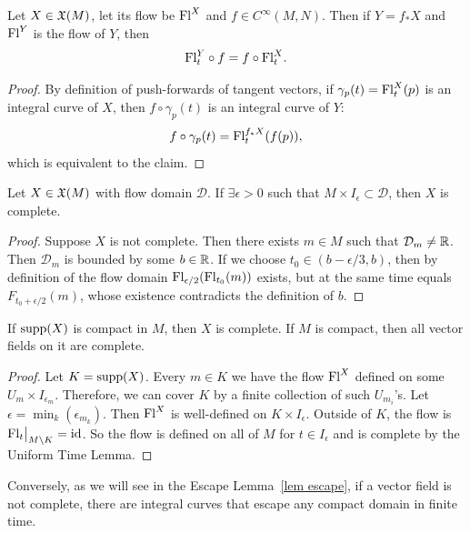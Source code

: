 \begin{cor}\label{cor naturality of flows}
    Let $X\in\mathfrak{X}(M)$, let its flow be $\mathrm{Fl}^X$ and $f\in C^\infty(M,N)$. Then if $Y=f_\ast X$ and $\mathrm{Fl}^Y$ is the flow of $Y$, then 
    \[\mathrm{Fl}^Y_t\circ f=f\circ \mathrm{Fl}^X_t.\]
\end{cor}
\begin{proof}
    By definition of push-forwards of tangent vectors, if $\gamma_p(t)=\mathrm{Fl}_t^X(p)$ is an integral curve of $X$, then $f\circ \gamma_p(t)$ is an integral curve of $Y$:
    \[f\circ \gamma_p(t)=\mathrm{Fl}^{f_\ast X}_t(f(p)),\]
    which is equivalent to the claim.
\end{proof}

\begin{thm}\label{lem uniform time}
    Let $X\in\mathfrak{X}(M)$ with flow domain $\mathcal{D}$. If $\exists\epsilon>0$ such that $M\times I_\epsilon\subset\mathcal{D}$, then $X$ is complete.
\end{thm}
\begin{proof}
    Suppose $X$ is not complete. Then there exists $m\in M$ such that $\mathcal{D}_m\neq \mathbb{R} $. Then $\mathcal{D}_m$ is bounded by some $b\in\mathbb{R} $. If we choose $t_0\in(b-\epsilon/3,b)$, then by definition of the flow domain $\mathrm{Fl}_{\epsilon/2}(\mathrm{Fl}_{t_0}(m))$ exists, but at the same time equals $F_{t_0+\epsilon/2}(m)$, whose existence contradicts the definition of $b$.
\end{proof}
\begin{cor}
    If $\operatorname{supp} (X)$ is compact in $M$, then $X$ is complete. If $M$ is compact, then all vector fields on it are complete.
\end{cor}
\begin{proof}
    Let $K=\operatorname{supp}(X)$. Every $m\in K$ we have the flow $\mathrm{Fl}^X$ defined on some $U_m\times I_{\epsilon_m}$. Therefore, we can cover $K$ by a finite collection of such $U_{m_i}$'s. Let $\epsilon=\min_k(\epsilon_{m_k})$. Then $\mathrm{Fl}^X$ is well-defined on $K\times I_\epsilon$. Outside of $K$, the flow is $\restr{\Fl_t}{M\setminus K}=\id$. So the flow is defined on all of $M$ for $t\in I_\epsilon$ and is complete by the Uniform Time Lemma.
\end{proof}

Conversely, as we will see in the Escape Lemma~\ref{lem escape}, if a vector field is not complete, there are integral curves that escape any compact domain in finite time.


